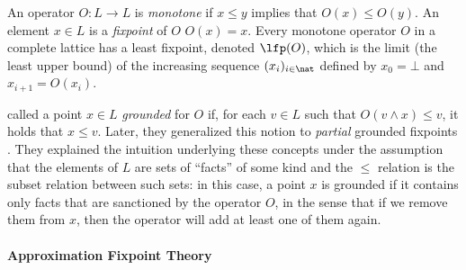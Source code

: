 {An operator $O:L\to L$ is \emph{monotone} if $x\leq y$ implies that $O(x)\leq O(y)$.
An element $x\in L$ is 
a \emph{fixpoint}
of $O$ 
$O(x)=x$.
Every monotone operator $O$ in a %
complete lattice has a least fixpoint, denoted $\lfp(O)$, which is 
the limit (the least upper bound) of the increasing sequence $(x_i)_{i \in \nat}$ defined by $x_0=\bot$ and $x_{i+1} = O(x_i)$. 


 called a point  $x\in L$ \emph{grounded} for $O$ if, for each $v\in L$ such that $O(v\land x)\leq v$, it holds that $x\leq v$. Later, they generalized this notion to \emph{partial} grounded fixpoints . 
They explained the intuition underlying these concepts under the assumption that the elements of $L$ are sets of ``facts'' of some kind and the $\leq$ relation is the subset relation between such sets:
in this case, a point $x$ is grounded if it contains only facts that are sanctioned by the operator $O$, 
in the sense that if we remove them from $x$, then the operator will add at least one of them again. 



\paragraph{Approximation Fixpoint Theory}


}
